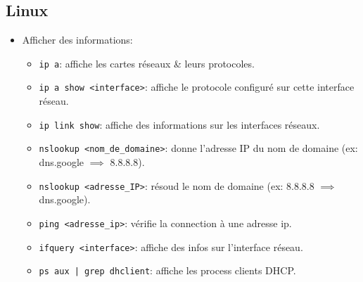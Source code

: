 \documentclass[a4paper]{article}
\renewcommand{\tt}{\texttt}
\begin{document}
\subsection{Linux}





\begin{itemize}





\item Afficher des informations:
\begin{itemize}
    \item \tt{ip a}: affiche les cartes réseaux \& leurs protocoles.
    \item \tt{ip a show <interface>}: affiche le protocole configuré sur cette interface réseau.
    \item \tt{ip link show}: affiche des informations sur les interfaces réseaux.
    \item \tt{nslookup <nom\_de\_domaine>}: donne l'adresse IP du nom de domaine (ex: dns.google $ \implies $ 8.8.8.8).
    \item \tt{nslookup <adresse\_IP>}: résoud le nom de domaine (ex: 8.8.8.8 $ \implies $ dns.google).
    \item \tt{ping <adresse\_ip>}: vérifie la connection à une adresse ip.
    \item \tt{ifquery <interface>}: affiche des infos sur l'interface réseau.
    \item \tt{ps aux | grep dhclient}: affiche les process clients DHCP.
\end{itemize}






\end{itemize}
\end{document}
